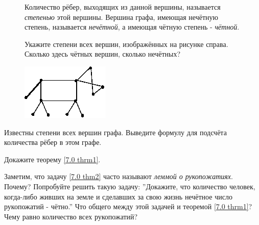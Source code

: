 {\setlength{\intextsep}{2pt}
\begin{figure}[h]
\begin{minipage}{0.8\linewidth}\setlength{\parindent}{1.5em}
\begin{dfn}
    Количество рёбер, выходящих из данной вершины, называется \textit{степенью} этой вершины. Вершина графа, имеющая нечётную степень, называется \textit{нечётной}, а имеющая чётную степень - \textit{чётной}.
\end{dfn}
\begin{ex}
    Укажите степени всех вершин, изображённых на рисунке справа. Сколько здесь чётных вершин, сколько нечётных?
\end{ex}
\end{minipage}
\hfill
\begin{minipage}{0.17\linewidth}
    \includegraphics[width=1\columnwidth]{img/loshadka.png}
\end{minipage}
\end{figure}}

\begin{thm} \label{7.0 thm2}
    Известны степени всех вершин графа. Выведите формулу для подсчёта количества рёбер в этом графе.
\end{thm}


\begin{thm} Докажите теорему \ref{7.0 thrm1}.
\par
    Заметим, что задачу \ref{7.0 thm2} часто называют \textit{леммой о рукопожатиях}. Почему? Попробуйте решить такую задачу: ''Докажите, что количество человек, когда-либо живших на земле и сделавших за свою жизнь нечётное число рукопожатий - чётно.'' Что общего между этой задачей и теоремой \ref{7.0 thrm1}? Чему равно количество всех рукопожатий?
\end{thm}

